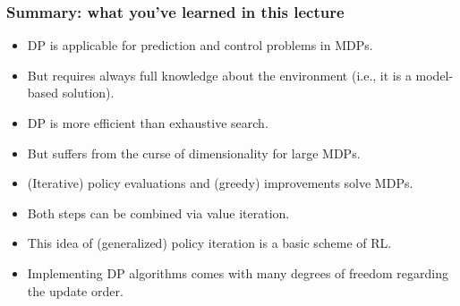 \begin{frame}
  \frametitle{Summary: what you've learned in this lecture}
  \begin{itemize}
  \item DP is applicable for prediction and control problems in MDPs.\pause
  \item But requires always full knowledge about the environment (i.e., it is a model-based solution).\pause
  \item DP is more efficient than exhaustive search.\pause
  \item But suffers from the curse of dimensionality for large MDPs.\pause
  \item (Iterative) policy evaluations and (greedy) improvements solve MDPs.\pause
  \item Both steps can be combined via value iteration.\pause
  \item This idea of (generalized) policy iteration is a basic scheme of RL.\pause
  \item Implementing DP algorithms comes with many degrees of freedom regarding the update order.
  \end{itemize}
\end{frame}
